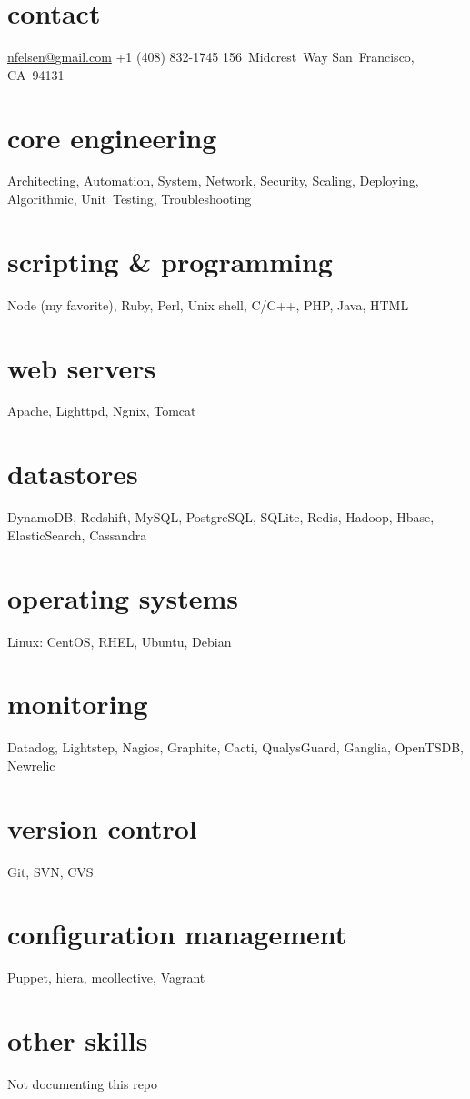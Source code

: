 \documentclass[]{friggeri-cv} %
\begin{document}


\begin{aside} %
\section{contact}
\href{mailto:nfelsen@gmail.com}{nfelsen@gmail.com}
+1 (408) 832-1745
156~Midcrest~Way
San~Francisco, CA~94131
\section{core engineering}
Architecting, Automation, System, Network, Security, Scaling, Deploying, Algorithmic, Unit~Testing, Troubleshooting
\section{scripting \& programming}
Node (my favorite), Ruby, Perl, Unix shell, C/C++, PHP, Java, HTML
\section{web servers}
Apache, Lighttpd, Ngnix, Tomcat
\section{datastores}
DynamoDB, Redshift, MySQL, PostgreSQL, SQLite, Redis, Hadoop, Hbase, ElasticSearch, Cassandra
\section{operating systems}
Linux: CentOS, RHEL, Ubuntu, Debian
\section{monitoring}
Datadog, Lightstep, Nagios, Graphite, Cacti, QualysGuard, Ganglia, OpenTSDB, Newrelic
\section{version control}
Git, SVN, CVS
\section{configuration management}
Puppet, hiera, mcollective, Vagrant
\section{other skills}
Not documenting this repo
\end{aside}
\end{document}

